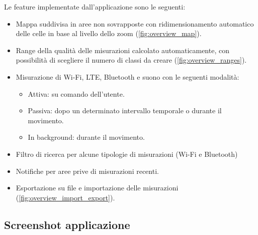\documentclass[11pt]{article}
\begin{document}
Le feature implementate dall'applicazione sono le seguenti:
\begin{itemize}
    \item Mappa suddivisa in aree non sovrapposte con ridimensionamento automatico delle celle in base al livello dello zoom (\cref{fig:overview_map}).
    \item Range della qualità delle misurazioni calcolato automaticamente, con possibilità di scegliere il numero di classi da creare (\cref{fig:overview_ranges}).
    \item Misurazione di Wi-Fi, LTE, Bluetooth e suono con le seguenti modalità:
    \begin{itemize}[topsep=0pt]
        \item Attiva: su comando dell'utente.
        \item Passiva: dopo un determinato intervallo temporale o durante il movimento. 
        \item In background: durante il movimento.
    \end{itemize}
    \item Filtro di ricerca per alcune tipologie di misurazioni (Wi-Fi e Bluetooth)
    \item Notifiche per aree prive di misurazioni recenti.
    \item Esportazione su file e importazione delle misurazioni (\cref{fig:overview_import_export}).
\end{itemize}


\subsection{Screenshot applicazione}
\end{document}
